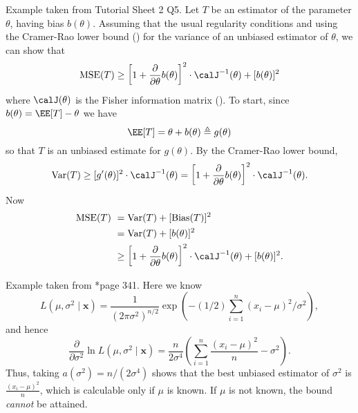 \begin{exam} \label{exam: MSE_Cramer_ineq}
    Example taken from Tutorial Sheet 2 Q5. Let $T$ be an estimator of the parameter $\theta$, having bias $b(\theta)$. Assuming that the usual regularity conditions and using the Cramer-Rao lower bound () for the variance of an unbiased estimator of $\theta$, we can show that
    \begin{equation*}
        \MSE (T) \geq \left[ 1 + \frac{\partial}{\partial \theta} b(\theta) \right]^2 \cdot \calJ^{-1} (\theta) + [b(\theta)]^2
    \end{equation*}
    where $\calJ (\theta)$ is the Fisher information matrix (). To start, since $b(\theta) = \EE [T] - \theta$ we have
    \begin{equation*}
        \EE [T] = \theta + b(\theta) \triangleq g(\theta)
    \end{equation*}
    so that $T$ is an unbiased estimate for $g(\theta)$. By the Cramer-Rao lower bound,
    \begin{equation*}
        \Var (T) \geq [g'(\theta)]^2 \cdot \calJ^{-1} (\theta) = \left[ 1 + \frac{\partial}{\partial \theta} b(\theta) \right]^2 \cdot \calJ^{-1} (\theta).
    \end{equation*}
    Now
    \begin{align*}
        \MSE (T) \
         & = \Var (T) + [\Bias (T)]^2                                                                                      \\
         & = \Var (T) + [b(\theta)]^2                                                                                      \\
         & \geq \left[ 1 + \frac{\partial}{\partial \theta} b(\theta) \right]^2 \cdot \calJ^{-1} (\theta) + [b(\theta)]^2.
    \end{align*}
\end{exam}

\begin{exam} \label{exam: norm_mse_p2}
    Example taken from \cite{CasellaGeorge2001SI}*{page 341}. Here we know
    \begin{equation*}
        L(\mu , \sigma^2 \mid \bm{x}) = \frac{1}{(2 \pi \sigma^2)^{n/2}} \exp \left( -(1/2) \sum_{i=1}^{n} (x_i - \mu)^2 / \sigma^2 \right),
    \end{equation*}
    and hence
    \begin{equation*}
        \frac{\partial}{\partial \sigma^2} \ln L(\mu , \sigma^2 \mid \bm{x}) = \frac{n}{2 \sigma^4} \left( \sum_{i=1}^{n} \frac{(x_i - \mu)^2}{n} - \sigma^2 \right).
    \end{equation*}
    Thus, taking $a(\sigma^2) = n / (2 \sigma^4)$ shows that the best unbiased estimator of $\sigma^2$ is $\frac{(x_i - \mu)^2}{n}$, which is calculable only if $\mu$ is known. If $\mu$ is not known, the bound {\it cannot} be attained.
\end{exam}

